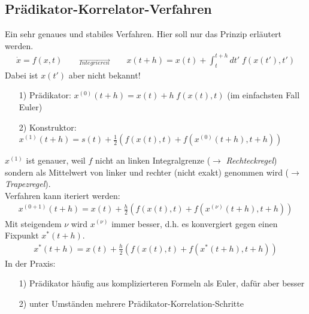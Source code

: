 \documentclass[12pt]{article}
\begin{document}
\subsection{Prädikator-Korrelator-Verfahren}
Ein sehr genaues und stabiles Verfahren. Hier soll nur das Prinzip erläutert werden.
\begin{align*}
\dot{x}= f(x,t) \qquad \overrightarrow{_{Integrieren}} \qquad x(t+h) = x(t) + \int_t^{t+h} dt' \; f(x(t'), t') 
\end{align*}
Dabei ist $x(t')$ aber nicht bekannt!

\begin{enumerate}
\item[1)] Prädikator: $x^{(0)} (t+h) = x(t) + h \; f(x(t), t)$ (im einfachsten Fall Euler)
\item[2)] Konstruktor: $ x^{(1)} (t+h) = s(t) + \frac{1}{2} \left( f(x(t),t) + f(x^{(0)} (t+h), t+h)\right) $
\end{enumerate}
$x^{(1)}$ ist genauer, weil $f$ nicht an linken Integralgrenze ($\to$ \textit{Rechteckregel}) sondern als Mittelwert von linker und rechter (nicht exakt) genommen wird ($\to$ \textit{Trapezregel}). \\
Verfahren kann iteriert werden:
\begin{align*}
x^{(0+1)} (t+h) = x(t) + \frac{h}{2} \left( f(x(t),t) + f(x^{(\nu)} (t+h), t+h)\right) 
\end{align*}
Mit steigendem $\nu$ wird $x^{(\nu)}$ immer besser, d.h. es konvergiert gegen einen Fixpunkt $x^* (t+h)$.
\begin{align*}
x^* (t+h) = x(t) + \frac{h}{2} \left( f(x(t),t) + f(x^* (t+h), t+h)\right) 
\end{align*}
In der Praxis:
\begin{enumerate}
\item[1)] Prädikator häufig aus komplizierteren Formeln als Euler, dafür aber besser
\item[2)] unter Umständen mehrere Prädikator-Korrelation-Schritte
\end{enumerate}
\end{document}
